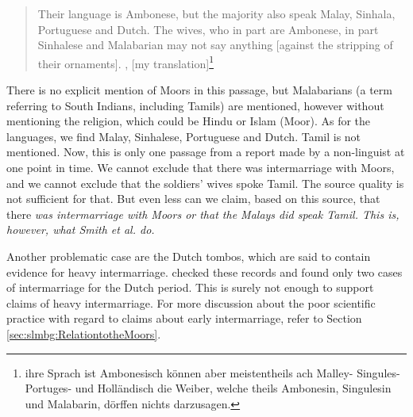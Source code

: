 \begin{quote}
    Their language is Ambonese, but the majority also speak Malay, Sinhala, Portuguese and Dutch. \el{} The wives, who in part are Ambonese, in part Sinhalese and Malabarian may not say anything [against the stripping of their ornaments]. \citep[106]{Schweitzer1931}, [my translation]\footnote{\el ihre Sprach ist Ambonesisch können aber meistentheils ach Malley- Singules- Portuges- und Holländisch \el die Weiber, welche theils Ambonesin, Singulesin und Malabarin, dörffen nichts darzusagen.}
\end{quote}

There is no explicit mention of Moors in this passage, but Malabarians (a term referring to South Indians, including Tamils) are mentioned, however without mentioning the religion, which could be Hindu or Islam (Moor). As for the languages, we find Malay, Sinhalese, Portuguese and Dutch. Tamil is not mentioned. Now, this is only one passage from a report made by a non-linguist at one point in time.
We cannot exclude that there was intermarriage with Moors, and we cannot exclude that the soldiers' wives spoke Tamil. The source quality is not sufficient for that. But even less can we claim, based on this source, that there \em was \em intermarriage with Moors or that the Malays did speak Tamil. This  is, however, what Smith et al. do.

Another problematic case are the Dutch tombos, which are said to contain evidence for heavy intermarriage.  \citet{Ansaldo2008genesis} checked these records and found only two cases of intermarriage for the Dutch period. This is  surely not enough to support claims of heavy intermarriage. For more discussion about the poor scientific practice with regard to claims about early intermarriage, refer to Section \ref{sec:slmbg:RelationtotheMoors}.

